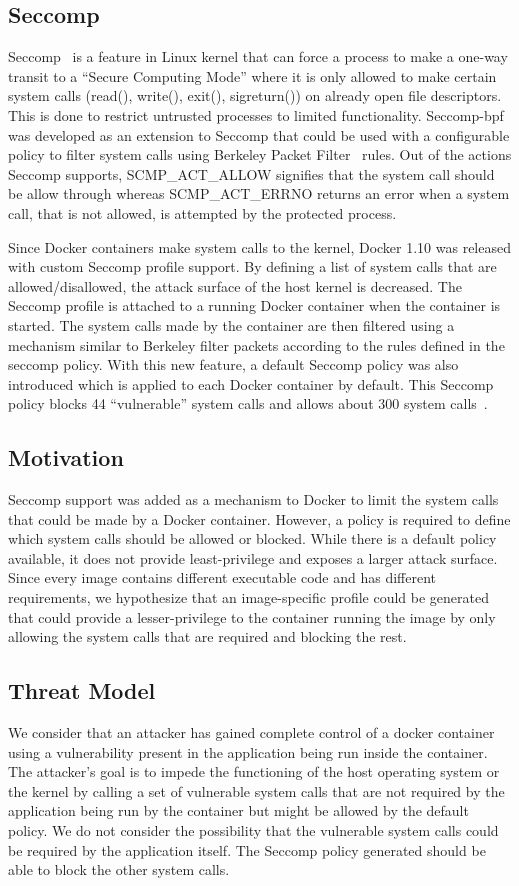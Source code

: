 \subsection{Seccomp}
Seccomp~\cite{seccomplinux} is a feature in Linux kernel that can force a process to make a one-way transit to a “Secure Computing Mode” where it is only allowed to make certain system calls (read(), write(), exit(), sigreturn()) on already open file descriptors. This is done to restrict untrusted processes to limited functionality. Seccomp-bpf~\cite{seccomplinux} was developed as an extension to Seccomp that could be used with a configurable policy to filter system calls using Berkeley Packet Filter~\cite{bpf1993} rules. Out of the actions Seccomp supports, SCMP\_ACT\_ALLOW signifies that the system call should be allow through whereas SCMP\_ACT\_ERRNO returns an error when a system call, that is not allowed, is attempted by the protected process.

Since Docker containers make system calls to the kernel, Docker 1.10 was released with custom Seccomp profile support. By defining a list of system calls that are allowed/disallowed, the attack surface of the host kernel is decreased. The Seccomp profile is attached to a running Docker container when the container is started. The system calls made by the container are then filtered using a mechanism similar to Berkeley filter packets according to the rules defined in the seccomp policy. With this new feature, a default Seccomp policy was also introduced which is applied to each Docker container by default. This Seccomp policy blocks 44 “vulnerable” system calls and allows about 300 system calls~\cite{defaultseccomp}.
\subsection{Motivation}
Seccomp support was added as a mechanism to Docker to limit the system calls that could be made by a Docker container. However, a policy is required to define which system calls should be allowed or blocked. While there is a default policy available, it does not provide least-privilege and exposes a larger attack surface. Since every image contains different executable code and has different requirements, we hypothesize that an image-specific profile could be generated that could provide a lesser-privilege to the container running the image by only allowing the system calls that are required and blocking the rest.
\subsection{Threat Model}
We consider that an attacker has gained complete control of a docker container using a vulnerability present in the application being run inside the container. The attacker’s goal is to impede the functioning of the host operating system or the kernel by calling a set of vulnerable system calls that are not required by the application being run by the container but might be allowed by the default policy. We do not consider the possibility that the vulnerable system calls could be required by the application itself. The Seccomp policy generated should be able to block the other system calls.